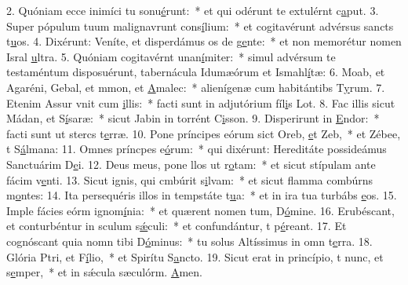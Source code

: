 2. Quóniam ecce inimíci tu sonu\uline{é}runt:~* et qui odérunt te extulérnt c\uline{a}put.
3. Super pópulum tuum malignavrunt cons\uline{í}lium:~* et cogitavérunt advérsus sancts t\uline{u}os.
4. Dixérunt: Veníte, et disperdámus os de g\uline{e}nte:~* et non memorétur nomen Isral \uline{u}ltra.
5. Quóniam cogitavérnt unan\uline{í}miter:~* simul advérsum te testaméntum disposuérunt, tabernácula Idumæórum et Ismahl\uline{í}tæ:
6. Moab, et Agaréni, Gebal, et mmon, et \uline{A}malec:~* alienígenæ cum habitántibs T\uline{y}rum.
7. Etenim Assur vnit cum \uline{i}llis:~* facti sunt in adjutórium fíl\uline{i}s Lot.
8. Fac illis sicut Mádan, et S\uline{í}saræ:~* sicut Jabin in torrént C\uline{i}sson.
9. Disperirunt in \uline{E}ndor:~* facti sunt ut stercs t\uline{e}rræ.
10. Pone príncipes eórum sict Oreb, \uline{e}t Zeb,~* et Zébee, t S\uline{á}lmana:
11. Omnes príncpes e\uline{ó}rum:~* qui dixérunt: Hereditáte possideámus Sanctuárim D\uline{e}i.
12. Deus meus, pone llos ut r\uline{o}tam:~* et sicut stípulam ante fácim v\uline{e}nti.
13. Sicut ignis, qui cmbúrit s\uline{i}lvam:~* et sicut flamma combúrns m\uline{o}ntes:
14. Ita persequéris illos in tempstáte t\uline{u}a:~* et in ira tua turbábs \uline{e}os.
15. Imple fácies eórm ignom\uline{í}nia:~* et quærent nomen tum, D\uline{ó}mine.
16. Erubéscant, et conturbéntur in sculum s\uline{ǽ}culi:~* et confundántur, t p\uline{é}reant.
17. Et cognóscant quia nomn tibi D\uline{ó}minus:~* tu solus Altíssimus in omn t\uline{e}rra.
18. Glória Ptri, et F\uline{í}lio,~* et Spirítu S\uline{a}ncto.
19. Sicut erat in princípio, t nunc, et s\uline{e}mper,~* et in sǽcula sæculórm. \uline{A}men.

